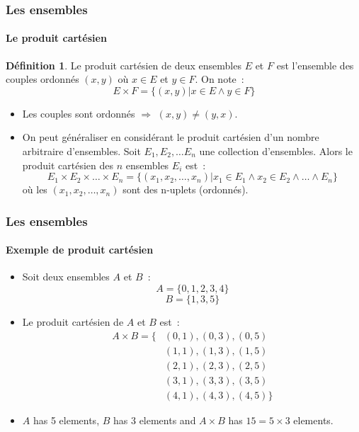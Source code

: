 \documentclass[10pt,notheorems]{beamer}
\theoremstyle{plain}
\theoremstyle{definition} %
\newtheorem{definition}{Définition}
\begin{document}
\begin{frame}
  \frametitle{Les ensembles}
  \framesubtitle{Le produit cartésien}
  \hypertarget{slide_ensembles_produit}{}

  \begin{definition}\label{def:produit_cartesien} Le produit cartésien de deux ensembles $E$ et $F$ est l'ensemble des couples ordonnés $(x,y)$ où $x \in E$ et $y \in F$. On note~:
    \[
      E\times F = \{(x, y) | x\in E \land y\in F\}
    \]
  \end{definition}

  \bigskip

  \begin{itemize}

  \item[\dbend] Les couples sont ordonnés $\Rightarrow$ $(x,y) \neq (y, x)$.\newline\newline

  \item On peut généraliser en considérant le produit cartésien d'un nombre arbitraire d'ensembles. Soit $E_1, E_2, \ldots E_n$ une collection d'ensembles. Alors le produit cartésien des $n$ ensembles $E_i$ est~:
    \[
      E_1\times E_2 \times \ldots \times E_n = \{(x_1,x_2, \ldots, x_n)| x_1\in E_1 \land x_2\in E_2 \land \ldots \land E_n\}
    \]
    où les $(x_1,x_2, \ldots, x_n)$ sont des n-uplets (ordonnés).

  \end{itemize}

\end{frame}


\begin{frame}
  \frametitle{Les ensembles}
  \framesubtitle{Exemple de produit cartésien}
  \hypertarget{slide_exemple_ensembles_produit}{}


  \begin{itemize}

  \item Soit deux ensembles $A$ et $B$~:
    \[
      A = \{0,1,2,3,4\}
    \]
    \[
      B = \{1,3,5\}
    \]


  \item Le produit cartésien de $A$ et $B$ est~:
    \[
      \begin{split}
        A\times B = \{&(0,1), (0,3), (0,5)\\
        &(1,1), (1,3), (1,5)\\
        &(2,1), (2,3), (2,5)\\
        &(3,1), (3,3), (3,5)\\
        &(4,1), (4,3), (4,5)\}
      \end{split}
    \]

  \item $A$ has 5 elements, $B$ has 3 elements and $A\times B$ has $15=5\times 3$ elements.

  \end{itemize}

\end{frame}
\end{document}
